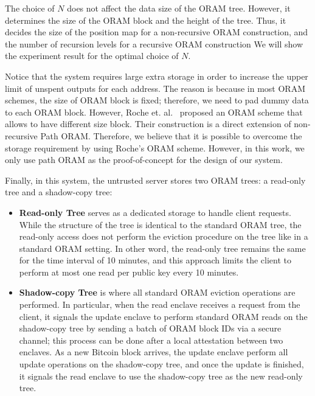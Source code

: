 \begin{newtext}
\begin{remark}
	The choice of $N$ does not affect the data size of the ORAM tree. 
	However, it determines the size of the ORAM block and the height of the tree.
	Thus, it decides the size of the position map for a non-recursive ORAM construction, 
	and the number of recursion levels for a recursive ORAM construction	
	We will show the experiment result for the optimal choice of $N$.
\end{remark}
\begin{remark}
	Notice that the system requires large extra storage in order to increase the upper limit of unspent outputs for each address. 
	The reason is because in most ORAM schemes, the size of ORAM block is fixed; therefore, we need to pad dummy data to each ORAM block. 
	However, Roche et. al.~\cite{roche-voram} proposed an ORAM scheme that allows to have different size block. 
	Their construction is a direct extension of non-recursive Path ORAM.
	Therefore, we believe that it is possible to overcome the storage requirement by using Roche's ORAM scheme.
	However, in this work, we only use path ORAM as the proof-of-concept for the design of our system.
\end{remark}
\end{newtext}

Finally, in this system, the untrusted server stores two ORAM trees: a read-only tree and a shadow-copy tree: 
\begin{itemize}
	\item \textbf{Read-only Tree} serves as a dedicated storage to handle client requests. While the structure of the tree is identical to the standard ORAM tree, the read-only access does not perform the eviction procedure on the tree like in a standard ORAM setting. 
	In other word, the read-only tree remains the same for the time interval of 10 minutes, and this approach limits the client to perform at most one read per public key every 10 minutes.
	\item \textbf{Shadow-copy Tree} is where all standard ORAM eviction operations are performed. 
	In particular, when the read enclave receives a request from the client, 
	it signals the update enclave to perform standard ORAM reads on the shadow-copy tree by sending a batch of ORAM block IDs via a secure channel; 
	this process can be done after a local attestation between two enclaves. 
	As a new Bitcoin block arrives, the update enclave perform all update operations on the shadow-copy tree, and once the update is finished, it signals the read enclave to use the shadow-copy tree as the new read-only tree. 
\end{itemize}
